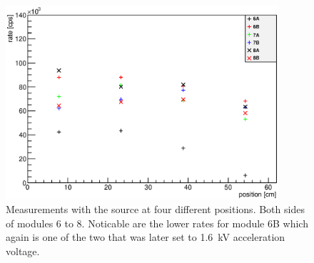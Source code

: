     \begin{figure}
		\centering
		\includegraphics[width = 0.9\textwidth]{graphics/analysis/678final.eps}
  	\caption[Testing of Muon Modules with Sr Source - Modules 6 - 8]{Measurements with the source at four different positions. Both sides of modules 6 to 8. Noticable are the lower rates for module 6B which again is one of the two that was later set to \SI{1.6}{\kilo\volt} acceleration voltage. }
  	\label{fig:SrRatesPMT678}
  \end{figure}

